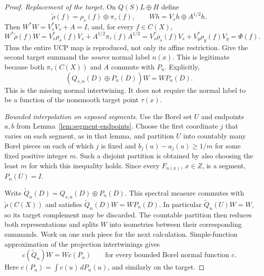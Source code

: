 \documentclass[11pt,letterpaper]{amsart}
\theoremstyle{definition}
\theoremstyle{remark}
\numberwithin{equation}{section}
\begin{document}
\begin{proof}
\emph{Replacement of the target.}
On $Q(S)L\oplus H$ define
\[
 \widetilde\rho(f)=\rho_s(f)\oplus\pi_\tau(f),
 \qquad Wh=V_sh\oplus A^{1/2}h.
\]
Then $W^*W=V_s^*V_s+A=I$, and, for every $f\in C(X)$,
\[
 W^*\widetilde\rho(f)W
 =V_s^*\rho_s(f)V_s+A^{1/2}\pi_\tau(f)A^{1/2}
 =V_s^*\rho_s(f)V_s+V_y^*\rho_y(f)V_y
 =\Phi(f).
\]
Thus the entire UCP map is reproduced, not only its affine restriction.
Give the second target summand the \emph{source} normal label $n(x)$.
This is legitimate because both $\pi_\tau(C(X))$ and $A$ commute with
$P_n$. Explicitly,
\[
 (Q_{s,n}(D)\oplus P_n(D))W=WP_n(D).
\]
This is the missing normal intertwining. It does not require the normal
label to be a function of the nonsmooth target point $\tau(x)$.

\emph{Bounded interpolation on exposed segments.}
Use the Borel set $U$ and endpoints $a,b$ from
Lemma~\ref{lem:segment-endpoints}. Choose the first coordinate $j$
that varies on each segment, as in that lemma, and partition $U$
into countably many Borel pieces on each of which $j$ is fixed and
$b_j(u)-a_j(u)\ge1/m$ for some fixed positive integer $m$.
Such a disjoint partition is obtained by also choosing the least
$m$ for which this inequality holds. Since every $F_{n(x)}$, $x\in Z$,
is a segment, $P_n(U)=I$.

Write $\widetilde Q_n(D)=Q_{s,n}(D)\oplus P_n(D)$.
This spectral measure commutes with $\widetilde\rho(C(X))$ and
satisfies $\widetilde Q_n(D)W=WP_n(D)$. In particular
$\widetilde Q_n(U)W=W$, so its target complement may be discarded.
The countable partition then reduces both representations and splits
$W$ into isometries between their corresponding summands. Work on one
such piece for the next calculation. Simple-function approximation
of the projection intertwinings gives
\[
 c(\widetilde Q_n)W=Wc(P_n)
 \qquad\text{for every bounded Borel normal function }c.
\]
Here $c(P_n)=\int c(u)\,dP_n(u)$, and similarly on the target.


\end{proof}
\end{document}
